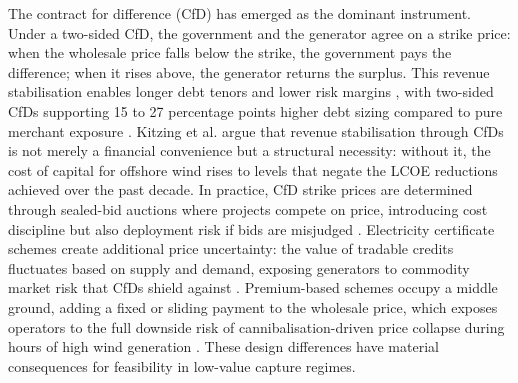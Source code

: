 \begin{table}[ht]
\centering
\small
\caption{Principal revenue support mechanisms for offshore wind energy. Market exposure ranges from zero (fixed feed-in tariff) to full (merchant), with two-sided contracts for difference (CfDs) dominating North Sea procurement and certificate or premium schemes more common in the Baltic. Basin prevalence reflects 2024 policy landscape.}
\label{tab:support_mechanisms}
\end{table}

The contract for difference (CfD) has emerged as the dominant instrument. Under a two-sided CfD, the government and the generator agree on a strike price: when the wholesale price falls below the strike, the government pays the difference; when it rises above, the generator returns the surplus. This revenue stabilisation enables longer debt tenors and lower risk margins \cite{Beiter2024}, with two-sided CfDs supporting 15 to 27 percentage points higher debt sizing compared to pure merchant exposure \cite{Dukan2025}. Kitzing et al. \cite{Kitzing2024} argue that revenue stabilisation through CfDs is not merely a financial convenience but a structural necessity: without it, the cost of capital for offshore wind rises to levels that negate the LCOE reductions achieved over the past decade. In practice, CfD strike prices are determined through sealed-bid auctions where projects compete on price, introducing cost discipline but also deployment risk if bids are misjudged \cite{Anatolitis2025}. Electricity certificate schemes create additional price uncertainty: the value of tradable credits fluctuates based on supply and demand, exposing generators to commodity market risk that CfDs shield against \cite{Kitzing2024}. Premium-based schemes occupy a middle ground, adding a fixed or sliding payment to the wholesale price, which exposes operators to the full downside risk of cannibalisation-driven price collapse during hours of high wind generation \cite{Dukan2025}. These design differences have material consequences for feasibility in low-value capture regimes.

